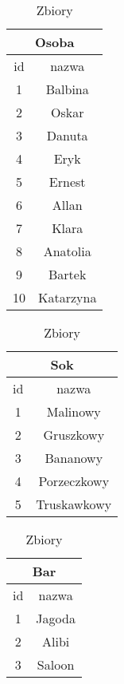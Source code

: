 \begin{table}
    \begin{tabular}[t]{|c|c|}
        \hline
        \multicolumn{2}{|c|}{Osoba} \\
        \hline
        id & nazwa \\
        \hline
        1 & Balbina \\
        2 & Oskar \\
        3 & Danuta \\
        4 & Eryk \\
        5 & Ernest \\
        6 & Allan \\
        7 & Klara \\
        8 & Anatolia \\
        9 & Bartek \\
        10 & Katarzyna \\
        \hline
    \end{tabular}
    \hfill
    \begin{tabular}[t]{|c|c|}
        \hline
        \multicolumn{2}{|c|}{Sok} \\
        \hline
        id & nazwa \\
        \hline
        1 & Malinowy \\
        2 & Gruszkowy \\
        3 & Bananowy \\
        4 & Porzeczkowy \\
        5 & Truskawkowy \\
        \hline
    \end{tabular}
    \hfill
    \begin{tabular}[t]{|c|c|}
        \hline
        \multicolumn{2}{|c|}{Bar} \\
        \hline
        id & nazwa \\
        \hline
        1 & Jagoda \\
        2 & Alibi \\
        3 & Saloon \\
        \hline
    \end{tabular}
    \caption{Zbiory}
\end{table}


